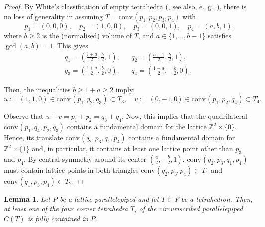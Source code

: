 \documentclass{amsart}
\theoremstyle{plain}
\newtheorem{lemma}[theorem]{Lemma}
\theoremstyle{definition}
\newcommand{\Z}{ \ensuremath{\mathbb{Z}}}
\newcommand{\conv}{\ensuremath{\mathrm{conv}}\hspace{1pt}}
\begin{document}
\begin{proof}
By White's classification of empty tetrahedra (\cite{White1964}, see also, e.~g.~\cite[Sect.~4.1]{HPPS-survey}), there is no loss of generality in assuming $T=\conv(p_1,p_2,p_3,p_4)$ with
\[
p_1=(0,0,0), \quad
p_2=(1,0,0), \quad
p_3=(0,0,1), \quad
p_4=(a,b,1).
\]
where $b\ge 2$ is the (normalized) volume of $T$, and $a\in \{1,\dots,b-1\}$ satisfies $\gcd(a,b)=1$. This gives 
\begin{align*}
q_1=\left(\frac{1+a}2,\frac{b}2,1\right), &&
q_2=\left(\frac{a-1}2,\frac{b}2,1\right), \quad\\
q_3=\left(\frac{1+a}2,\frac{b}2,0\right), &&
q_4=\left(\frac{1-a}2,-\frac{b}2,0\right).
\end{align*}

Then, the inequalities $b\ge 1+a \ge 2$ imply:
\[
u:=(1,1,0)\in \conv(p_1,p_2,q_3) \subset T_3, \quad
v:=(0,-1,0)\in \conv(p_1,p_2,q_4) \subset T_4.
\]

Observe that $u+v=p_1+p_2=q_3+q_4$.
Now, this implies that the quadrilateral $\conv(p_1,q_4,p_2,q_3)$ contains a fundamental domain for the lattice $\Z^2\times\{0\}$. Hence, its translate $\conv(q_2,p_3,q_1,p_4)$ contains a fundamental domain for $\Z^2\times\{1\}$ and, in particular, it contains at least one lattice point other than $p_3$ and $p_4$. By central symmetry around its center $\left(\frac{a}2,-\frac{b}2,1\right)$, $\conv(q_2,p_3,q_1,p_4)$ must contain lattice points in both triangles $\conv(q_2,p_3,p_4)\subset T_1$ and $\conv(q_1,p_3,p_4)\subset T_2$.

\end{proof}


\begin{lemma}
\label{lemma:3<4}
Let $P$ be a lattice parallelepiped and let $T\subset P$ be a tetrahedron. Then, at least one of the four corner tetrahedra $T_i$ of the circumscribed parallelepiped $C(T)$ is fully contained in $P$.
\end{lemma}
\end{document}
